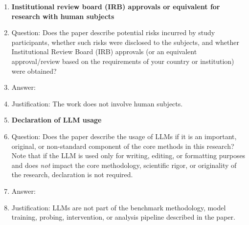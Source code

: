 \begin{enumerate}
\item {\bf Institutional review board (IRB) approvals or equivalent for research with human subjects}
    \item[] Question: Does the paper describe potential risks incurred by study participants, whether such risks were disclosed to the subjects, and whether Institutional Review Board (IRB) approvals (or an equivalent approval/review based on the requirements of your country or institution) were obtained?
    \item[] Answer: \answerNA{}
    \item[] Justification: The work does not involve human subjects.

\item {\bf Declaration of LLM usage}
    \item[] Question: Does the paper describe the usage of LLMs if it is an important, original, or non-standard component of the core methods in this research? Note that if the LLM is used only for writing, editing, or formatting purposes and does \emph{not} impact the core methodology, scientific rigor, or originality of the research, declaration is not required.
    \item[] Answer: \answerNA{}
    \item[] Justification: LLMs are not part of the benchmark methodology, model training, probing, intervention, or analysis pipeline described in the paper.

\end{enumerate}

